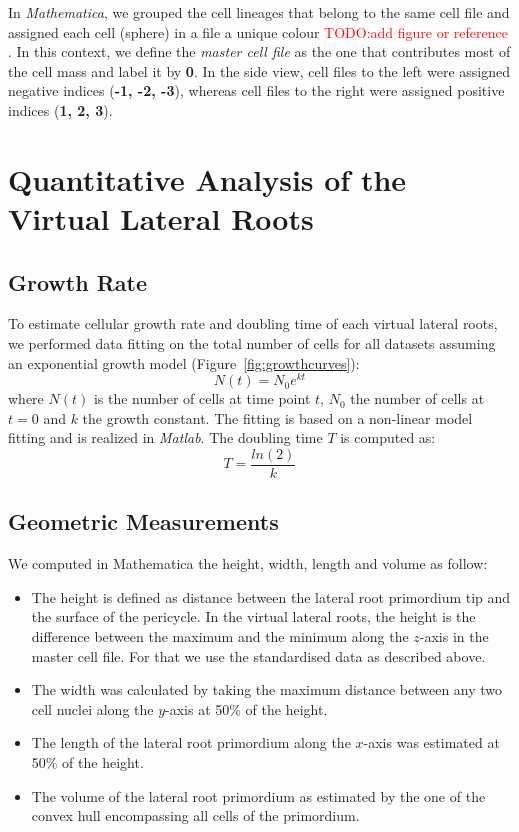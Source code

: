 \documentclass[11pt,a4paper, draft]{article}
\newcommand{\TODO}[1]{
\textcolor{red}{TODO:#1}
}
\newenvironment{Itemize}{
  \begin{itemize}[leftmargin=0.5cm]{
}}{\end{itemize}}
\begin{document}
In \textit{Mathematica}, we grouped the cell lineages that belong to the same cell file and assigned each cell (sphere) in a file a unique colour \TODO{add figure or reference}. In this context, we define the \textit{master cell file} as the one that contributes most of the cell mass and label it by \textbf{0}. In the side view, cell files to the left were assigned negative indices (\textbf{-1, -2, -3}), whereas cell files to the right were assigned positive indices (\textbf{1, 2, 3}).

\section{Quantitative Analysis of the Virtual Lateral Roots}
\subsection{Growth Rate}
To estimate cellular growth rate and doubling time of each virtual lateral roots, we performed data fitting on the total number of cells for all datasets assuming an exponential growth model (Figure~\ref{fig:growthcurves}):
\begin{equation}
N(t)=N_0e^{kt}
\end{equation} 
where $N(t)$ is the number of cells at time point $t$, $N_0$ the number of cells at $t=0$ and $k$ the growth constant. The fitting is based on a non-linear model fitting and is realized in \textit{Matlab}.
The doubling time $T$ is computed as:
\begin{equation}
T=\frac{ln(2)}{k}
\end{equation}

\subsection{Geometric Measurements}
We computed in Mathematica the height, width, length and volume as follow:
\begin{Itemize}
 \item The height is defined as distance between the lateral root primordium tip and the surface of the pericycle. In the virtual lateral roots, the height is the difference between the maximum and the minimum along the $z$-axis in the master cell file. For that we use the standardised data as described above.
 \item The width was calculated by taking the maximum distance between any two cell nuclei along the $y$-axis at 50\% of the height.
 \item The length of the lateral root primordium along the $x$-axis was estimated at 50\% of the height. 
 \item The volume of the lateral root primordium as estimated by the one of the convex hull encompassing all cells of the primordium.
\end{Itemize} 
\end{document}
